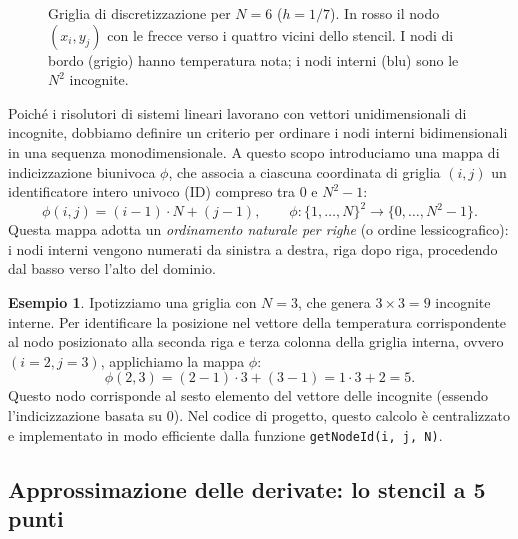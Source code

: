 \documentclass[a4paper,11pt]{article}
\theoremstyle{definition}
\newtheorem{esempio}{Esempio}[section]
\begin{document}
\begin{figure}[H]
    \caption{Griglia di discretizzazione per $N=6$ ($h=1/7$). In rosso il nodo $(x_i,y_j)$ con le frecce verso i quattro vicini dello stencil. I nodi di bordo (grigio) hanno temperatura nota; i nodi interni (blu) sono le $N^2$ incognite.}
    \label{fig:griglia}
\end{figure}

Poiché i risolutori di sistemi lineari lavorano con vettori unidimensionali di incognite, dobbiamo definire un criterio per ordinare i nodi interni bidimensionali in una sequenza monodimensionale. A questo scopo introduciamo una mappa di indicizzazione biunivoca $\phi$, che associa a ciascuna coordinata di griglia $(i,j)$ un identificatore intero univoco (ID) compreso tra $0$ e $N^2-1$:
\[
  \phi(i,j) = (i-1) \cdot N + (j-1), \qquad \phi : \{1,\ldots,N\}^2 \to \{0,\ldots,N^2-1\}.
\]
Questa mappa adotta un \emph{ordinamento naturale per righe} (o ordine lessicografico): i nodi interni vengono numerati da sinistra a destra, riga dopo riga, procedendo dal basso verso l'alto del dominio.

\begin{esempio}
Ipotizziamo una griglia con $N=3$, che genera $3 \times 3 = 9$ incognite interne. 
Per identificare la posizione nel vettore della temperatura corrispondente al nodo posizionato alla seconda riga e terza colonna della griglia interna, ovvero $(i=2, j=3)$, applichiamo la mappa $\phi$:
\[
  \phi(2,3) = (2-1)\cdot3 + (3-1) = 1\cdot3+2 = 5.
\]
Questo nodo corrisponde al sesto elemento del vettore delle incognite (essendo l'indicizzazione basata su $0$). Nel codice di progetto, questo calcolo è centralizzato e implementato in modo efficiente dalla funzione \texttt{getNodeId(i, j, N)}.
\end{esempio}



\subsection{Approssimazione delle derivate: lo stencil a 5 punti}
\end{document}
